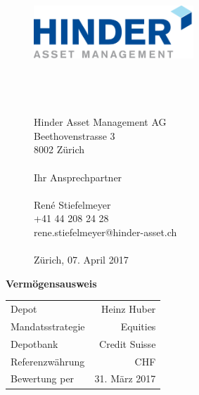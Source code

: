 \documentclass[9pt,landscape,a4paper]{report}
\title{}
\author{}
\date{}
\newenvironment{bottompar}{\par\vspace*{\fill}}{\clearpage}
\begin{document}
\thispagestyle{empty}

\begin{figure}
  \raggedleft
  \begin{minipage}{6cm}
  \includegraphics[width=6cm, height=5cm]{logo.png}
  \\
  \\
  Hinder Asset Management AG \\
  Beethovenstrasse 3 \\
  8002 Zürich        \\
    \vspace*{0.8cm}
  \\
  Ihr Ansprechpartner\\
  \vspace*{0.2cm} \\
  Ren\'e Stiefelmeyer \\
  +41 44 208 24 28 \\
  rene.stiefelmeyer@hinder-asset.ch \\
   \vspace*{0.2cm} \\
 Zürich, 07. April 2017

  \end{minipage}
\end{figure}

\def\arraystretch{1}

\begin{bottompar}
\textbf{\LARGE\textcolor{hblue}{Vermögensausweis}}
 \vspace*{0.2cm}
 \newline
    \begin{tabular}{@{} lr}

      Depot & Heinz Huber \\ 
      Mandatsstrategie & Equities \\ 
      Depotbank & Credit Suisse \\ 
      Referenzwährung & CHF \\ 
      Bewertung per & 31. März 2017 \\ 
        
    \end{tabular}
    \small
    \vspace*{3.2cm}
\end{bottompar}
\end{document}
